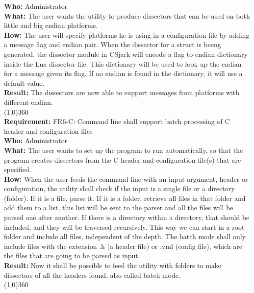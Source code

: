 \textbf{Who:} Administrator\\
\textbf{What:} The user wants the utility to produce dissectors that can be used on both little and big endian platforms.\\
\textbf{How:} The user will specify platforms he is using in a configuration file by adding a message flag and endian pair. When the dissector for a struct is beeng generated, the dissector module in CSjark will encode a flag to endian dictionary inside the Lua dissector file. This dictionary will be used to look up the endian for a message given its flag. If no endian is found in the dictionary, it will use a default value.\\
\textbf{Result:} The dissectors are now able to support messages from platforms with different endian.\\
\line(1,0){360}\\
\textbf{Requirement:} FR6-C: Command line shall support batch processing of C header and configuration files\\
\textbf{Who:} Administrator\\
\textbf{What:} The user wants to set up the program to run automatically, so that the program creates dissectors from the C header and configuration file(s) that are specified.\\
\textbf{How:} When the user feeds the command line with an input argument, header or configuration, the utility shall check if the input is a single file or a directory (folder). If it is a file, parse it. If it is a folder, retrieve all files in that folder and add them to a list, this list will be sent to the parser and all the files will be parsed one after another. If there is a directory within a directory, that should be included, and they will be traversed recursively. This way we can start in a root folder and include all files, independent of the depth. The batch mode shall only include files with the extension .h (a header file) or .yml (config file), which are the files that are going to be parsed as input.\\
\textbf{Result:} Now it shall be possible to feed the utility with folders to make dissectors of all the headers found, also called batch mode.\\
\line(1,0){360}\\	

